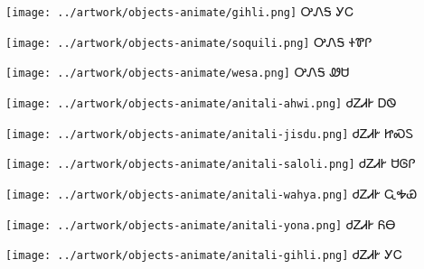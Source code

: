 \documentclass[avery5371,frame]{flashcards}%
\begin{document}
\begin{flashcard}{
\texttt{[image: ../artwork/objects-animate/gihli.png]}
}\Huge ᎤᏁᎦ ᎩᏟ
\end{flashcard}

\begin{flashcard}{
\texttt{[image: ../artwork/objects-animate/soquili.png]}
}\Huge ᎤᏁᎦ ᏐᏈᎵ
\end{flashcard}

\begin{flashcard}{
\texttt{[image: ../artwork/objects-animate/wesa.png]}
}\Huge ᎤᏁᎦ ᏪᏌ
\end{flashcard}

\begin{flashcard}{
\texttt{[image: ../artwork/objects-animate/anitali-ahwi.png]}
}\Huge ᏧᏃᏗᎨ ᎠᏫ
\end{flashcard}

\begin{flashcard}{
\texttt{[image: ../artwork/objects-animate/anitali-jisdu.png]}
}\Huge ᏧᏃᏗᎨ ᏥᏍᏚ
\end{flashcard}

\begin{flashcard}{
\texttt{[image: ../artwork/objects-animate/anitali-saloli.png]}
}\Huge ᏧᏃᏗᎨ ᏌᎶᎵ
\end{flashcard}

\begin{flashcard}{
\texttt{[image: ../artwork/objects-animate/anitali-wahya.png]}
}\Huge ᏧᏃᏗᎨ ᏩᎭᏯ
\end{flashcard}

\begin{flashcard}{
\texttt{[image: ../artwork/objects-animate/anitali-yona.png]}
}\Huge ᏧᏃᏗᎨ ᏲᎾ
\end{flashcard}

\begin{flashcard}{
\texttt{[image: ../artwork/objects-animate/anitali-gihli.png]}
}\Huge ᏧᏃᏗᎨ ᎩᏟ
\end{flashcard}
\end{document}
